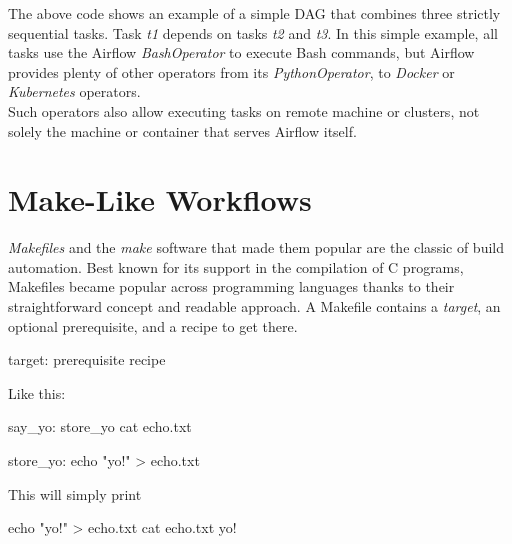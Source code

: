 \documentclass[
  12pt,
  letterpaper,
]{krantz}
\newenvironment{Shaded}{\begin{snugshade}}{\end{snugshade}}
\newcommand{\BuiltInTok}[1]{\textcolor[rgb]{0.00,0.23,0.31}{#1}}
\newcommand{\ExtensionTok}[1]{\textcolor[rgb]{0.00,0.23,0.31}{#1}}
\newcommand{\FunctionTok}[1]{\textcolor[rgb]{0.28,0.35,0.67}{#1}}
\newcommand{\NormalTok}[1]{\textcolor[rgb]{0.00,0.23,0.31}{#1}}
\newcommand{\OperatorTok}[1]{\textcolor[rgb]{0.37,0.37,0.37}{#1}}
\newcommand{\StringTok}[1]{\textcolor[rgb]{0.13,0.47,0.30}{#1}}
\begin{document}
The above code shows an example of a simple DAG that combines three
strictly sequential tasks. Task \emph{t1} depends on tasks \emph{t2} and
\emph{t3}. In this simple example, all tasks use the Airflow
\emph{BashOperator} to execute Bash commands, but Airflow provides
plenty of other operators from its \emph{PythonOperator},
to \emph{Docker} or \emph{Kubernetes} operators.\\
Such operators also allow executing tasks on remote machine or clusters,
not solely the machine or container that serves Airflow itself.

\hypertarget{make-like-workflows}{%
\section{\texorpdfstring{Make-Like
Workflows}{Make-Like Workflows}}\label{make-like-workflows}}

\emph{Makefiles} and the \emph{make} software that made them popular are
the classic of build automation. Best known for its
support in the compilation of C programs, Makefiles became popular
across programming languages thanks to their straightforward concept and
readable approach. A Makefile contains a \emph{target}, an optional
prerequisite, and a recipe to get there.

\begin{Shaded}
\begin{Highlighting}[]
\ExtensionTok{target:}\NormalTok{ prerequisite}
    \ExtensionTok{recipe}
\end{Highlighting}
\end{Shaded}

Like this:

\begin{Shaded}
\begin{Highlighting}[]
\ExtensionTok{say\_yo:}\NormalTok{ store\_yo}
    \FunctionTok{cat}\NormalTok{ echo.txt}

\ExtensionTok{store\_yo:} 
    \BuiltInTok{echo} \StringTok{"yo!"} \OperatorTok{\textgreater{}}\NormalTok{ echo.txt}
\end{Highlighting}
\end{Shaded}

This will simply print

\begin{Shaded}
\begin{Highlighting}[]
\BuiltInTok{echo} \StringTok{"yo!"} \OperatorTok{\textgreater{}}\NormalTok{ echo.txt}
\FunctionTok{cat}\NormalTok{ echo.txt}
\ExtensionTok{yo!}
\end{Highlighting}
\end{Shaded}
\end{document}
